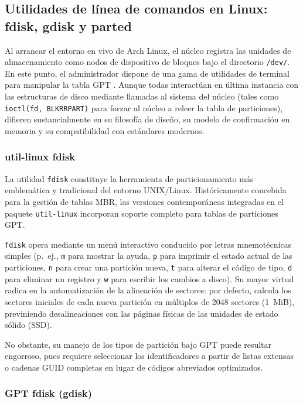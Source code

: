 \documentclass[12pt]{article}
\begin{document}
\subsection{Utilidades de línea de comandos en Linux: fdisk, gdisk y parted}
\label{sec:utilidadesLinux}

Al arrancar el entorno en vivo de Arch Linux, el núcleo registra las unidades de almacenamiento como nodos de dispositivo de bloques bajo el directorio \texttt{/dev/}. En este punto, el administrador dispone de una gama de utilidades de terminal para manipular la tabla GPT \parencite[\S 11.5, pp.\ 525--527]{stallings2018operating}. Aunque todas interactúan en última instancia con las estructuras de disco mediante llamadas al sistema del núcleo (tales como \texttt{ioctl(fd, BLKRRPART)} para forzar al núcleo a releer la tabla de particiones), difieren sustancialmente en su filosofía de diseño, su modelo de confirmación en memoria y su compatibilidad con estándares modernos.

\subsubsection{util-linux fdisk}

La utilidad \texttt{fdisk} constituye la herramienta de particionamiento más emblemática y tradicional del entorno UNIX/Linux. Históricamente concebida para la gestión de tablas MBR, las versiones contemporáneas integradas en el paquete \texttt{util-linux} incorporan soporte completo para tablas de particiones GPT.

\texttt{fdisk} opera mediante un menú interactivo conducido por letras mnemotécnicas simples (p.~ej., \texttt{m} para mostrar la ayuda, \texttt{p} para imprimir el estado actual de las particiones, \texttt{n} para crear una partición nueva, \texttt{t} para alterar el código de tipo, \texttt{d} para eliminar un registro y \texttt{w} para escribir los cambios a disco). Su mayor virtud radica en la automatización de la alineación de sectores: por defecto, calcula los sectores iniciales de cada nueva partición en múltiplos de 2048 sectores (1~MiB), previniendo desalineaciones con las páginas físicas de las unidades de estado sólido (SSD). 

No obstante, su manejo de los tipos de partición bajo GPT puede resultar engorroso, pues requiere seleccionar los identificadores a partir de listas extensas o cadenas GUID completas en lugar de códigos abreviados optimizados.

\subsubsection{GPT fdisk (gdisk)}
\end{document}
